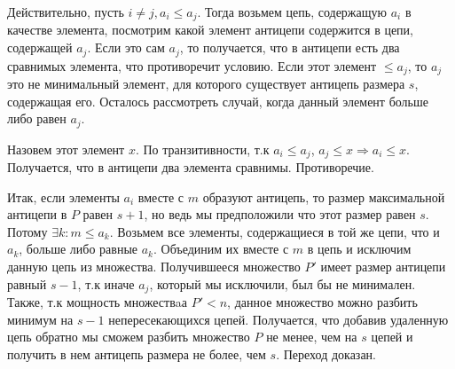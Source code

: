 {    Действительно, пусть $i \neq j, a_i \le a_j$. Тогда возьмем цепь, содержащую $a_i$ в качестве элемента, посмотрим какой элемент антицепи содержится в цепи, содержащей $a_j$. Если это сам $a_j$, то получается, что в антицепи есть два сравнимых элемента, что противоречит условию. Если этот элемент $\le a_j$, то $a_j$ это не минимальный элемент, для которого существует антицепь размера $s$, содержащая его. Осталось рассмотреть случай, когда данный элемент больше либо равен $a_j$.

    Назовем этот элемент $x$. По транзитивности, т.к $a_i \le a_j$, $a_j \le x \Rightarrow a_i \le x$. Получается, что в антицепи два элемента сравнимы. Противоречие.

    Итак, если элементы $a_i$ вместе с $m$ образуют антицепь, то размер максимальной антицепи в $P$ равен $s + 1$, но ведь мы предположили что этот размер равен $s$. Потому $\exists k: m \le a_k$. Возьмем все элементы, содержащиеся в той же цепи, что и $a_k$, больше либо равные $a_k$. Объединим их вместе с $m$ в цепь и исключим данную цепь из множества. Получившееся множество $P'$ имеет размер антицепи равный $s - 1$, т.к иначе $a_j$, который мы исключили, был бы не минимален. Также, т.к мощность множествaа $P' < n$, данное множество можно разбить минимум на $s - 1$ непересекающихся цепей. Получается, что добавив удаленную цепь обратно мы сможем разбить множество $P$ не менее, чем на $s$ цепей и получить в нем антицепь размера не более, чем $s$. Переход доказан.
}
